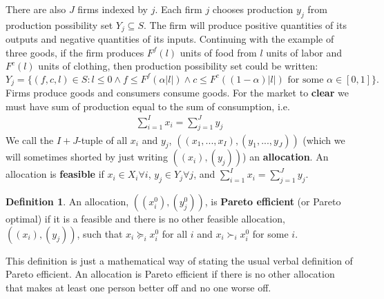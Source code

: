 \documentclass[12pt,reqno]{amsart}
\theoremstyle{definition}
\newtheorem{definition}{Definition}[section]
\newcommand{\prefeq}{\succeq}
\newcommand{\pref}{\succ}
\begin{document}
There are also $J$ firms indexed by $j$. Each firm $j$ chooses
production $y_j$ from production possibility set $Y_j \subseteq
S$. The firm will produce positive quantities of its outputs and
negative quantities of its inputs. Continuing with the example of
three goods, if the firm produces $F^f(l)$ units of food from $l$
units of labor and $F^c(l)$ units of clothing, then production
possibility set could be written: 
\[ Y_j = \{ (f,c,l) \in S: l \leq 0 \wedge f \leq F^f(\alpha |l|)
\wedge c \leq F^c((1-\alpha) |l|) \text{ for some } \alpha \in
[0,1]\}. \] 
Firms produce goods and consumers consume goods. For the market to
\textbf{clear} we must have sum of production equal to the sum of
consumption, 
i.e. 
\begin{align*}
  \sum_{i=1}^I x_i = \sum_{j=1}^J y_j \label{eq:mc}
\end{align*}
We call the $I+J$-tuple of all $x_i$ and $y_j$, $\left( (x_1,..., x_I)
  , (y_1, ..., y_J) \right)$ (which we will sometimes shorted by just
writing $((x_i),(y_j))$) an \textbf{allocation}. An allocation is
\textbf{feasible} if $x_i \in X_i \forall i$, $y_j \in Y_j \forall j$,
and $ \sum_{i=1}^I x_i = \sum_{j=1}^J y_j$.
\begin{definition}
  An allocation, $((x_i^0),(y_j^0))$, is \textbf{Pareto efficient} (or
  Pareto optimal) if it is a feasible and there is no other feasible
  allocation, $((x_i),(y_j))$, such that $x_i \prefeq_i x_i^0$ for all
  $i$ and $x_i \pref_i x_i^0$ for some $i$.
\end{definition}
This definition is just a mathematical way of stating the usual verbal
definition of Pareto efficient. An allocation is Pareto efficient if
there is no other allocation that makes at least one person better off
and no one worse off. 
\end{document}
